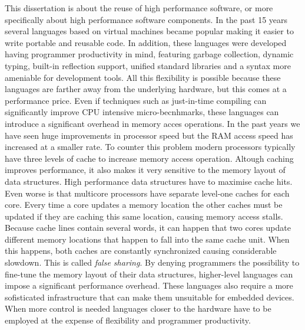 This dissertation is about the reuse of high performance software, or more specifically about
high performance software components. In the past 15 years several languages
based on virtual machines became popular making it easier to write portable and reusable code.
In addition, these languages were developed having programmer productivity in mind, featuring garbage
collection, dynamic typing, built-in reflection support, unified standard libraries and a syntax more
ameniable for development tools. All this flexibility is possible because these languages are farther
away from the underlying hardware, but this comes at a performance price. Even if techniques such
as just-in-time compiling \cite{Aycock} can significantly improve CPU intensive micro-becnhmarks,
these languages can introduce a significant overhead in memory acces operations. In the past
years we have seen huge improvements in processor speed but the RAM access speed has increased at
a smaller rate. To counter this problem modern processors typically have three levels of cache to increase
memory access operation. Altough caching improves performance, it also makes it very sensitive to the memory
layout of data structures. High performance data structures have to maximise cache hits. Even worse
is that multicore processors have separate level-one caches for each core. Every time a core updates
a memory location the other caches must be updated if they are caching this same location, causing
memory access stalls. Because cache lines contain several words, it can happen that two cores update
different memory locations that happen to fall into the same cache unit. When this happens, both caches
are constantly synchronized causing considerable slowdown. This is called \emph{false sharing}.
By denying programmers the possibility to fine-tune the memory layout of their data structures,
higher-level languages can impose a significant performance overhead. These languages also require
a more sofisticated infrastructure that can make them unsuitable for embedded devices.
When more control is needed languages closer to the hardware have to be employed at the expense
of flexibility and programmer productivity.

